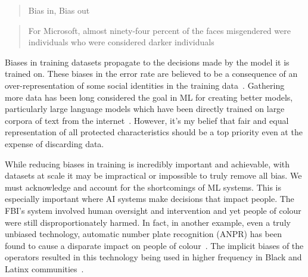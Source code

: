 \documentclass[]{final_report}
\begin{document}
\begin{quote}
  Bias in, Bias out~\cite{facialRecognitionBias}
\end{quote}

\begin{quote}
  For Microsoft, almost ninety-four percent of
  the faces misgendered were individuals who were considered darker individuals~\cite{facialRecognitionBias}
\end{quote}

Biases in training datasets propagate to the decisions made by the model it is trained on. These biases in the error rate are believed to be a consequence of an over-representation of some social identities in the training data~\cite{LLMSocialEthicalRisks}. Gathering more data has been long considered the goal in ML for creating better models, particularly large language models which have been directly trained on large corpora of text from the internet~\cite{LLMSocialEthicalRisks}. However, it's my belief that fair and equal representation of all protected characteristics should be a top priority even at the expense of discarding data.

\newpage
While reducing biases in training is incredibly important and achievable, with datasets at scale it may be impractical or impossible to truly remove all bias. We must acknowledge and account for the shortcomings of ML systems. This is especially important where AI systems make decisions that impact people. The FBI's system involved human oversight and intervention and yet people of colour were still disproportionately harmed. In fact, in another example, even a truly unbiased technology, automatic number plate recognition (ANPR) has been found to cause a disparate impact on people of colour~\cite{anprAccountability}. The implicit biases of the operators resulted in this technology being used in higher frequency in Black and Latinx communities~\cite{anprAccountability,facialRecognitionBias}.
\end{document}
